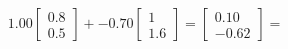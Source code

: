 \documentclass[preview]{standalone}
\begin{document}
\begin{align*}
1.00 \begin{bmatrix} 0.8 \\ 0.5 \end{bmatrix} + -0.70 \begin{bmatrix} 1 \\ 1.6 \end{bmatrix} = \begin{bmatrix} 0.10 \\ -0.62 \end{bmatrix} =
\end{align*}
\end{document}
